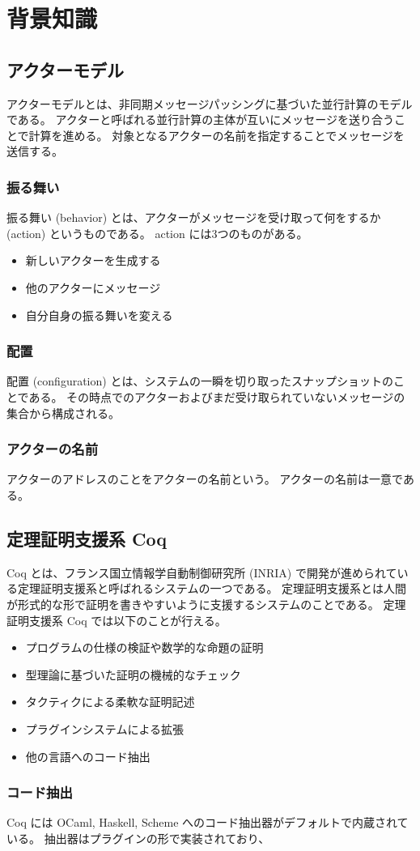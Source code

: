 \chapter{背景知識}

\section{アクターモデル}

アクターモデルとは、非同期メッセージパッシングに基づいた並行計算のモデルである。
アクターと呼ばれる並行計算の主体が互いにメッセージを送り合うことで計算を進める。
対象となるアクターの名前を指定することでメッセージを送信する。


\subsection{振る舞い}

振る舞い (behavior) とは、アクターがメッセージを受け取って何をするか (action) というものである。
action には3つのものがある。

\begin{itemize}
\item 新しいアクターを生成する
\item 他のアクターにメッセージ
\item 自分自身の振る舞いを変える
\end{itemize}


\subsection{配置}

配置 (configuration) とは、システムの一瞬を切り取ったスナップショットのことである。
その時点でのアクターおよびまだ受け取られていないメッセージの集合から構成される。

\subsection{アクターの名前}

アクターのアドレスのことをアクターの名前という。
アクターの名前は一意である。


\section{定理証明支援系 Coq}

Coq とは、フランス国立情報学自動制御研究所 (INRIA) で開発が進められている定理証明支援系と呼ばれるシステムの一つである。
定理証明支援系とは人間が形式的な形で証明を書きやすいように支援するシステムのことである。
定理証明支援系 Coq では以下のことが行える。

\begin{itemize}
\item プログラムの仕様の検証や数学的な命題の証明
\item 型理論に基づいた証明の機械的なチェック
\item タクティクによる柔軟な証明記述
\item プラグインシステムによる拡張
\item 他の言語へのコード抽出
\end{itemize}

\subsection{コード抽出}

Coq には OCaml, Haskell, Scheme へのコード抽出器がデフォルトで内蔵されている。
抽出器はプラグインの形で実装されており、
